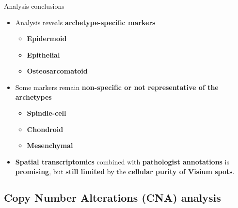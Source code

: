 \documentclass[aspectratio=169]{beamer}
\newcommand{\figpath}{/mnt/datadisk/Jordan/Delivrables/Rapports/Rapport_stage/Figures/Sans_légendes}
\begin{document}
\begin{frame}{Analysis conclusions}

    \begin{itemize}
        \item Analysis reveals \textbf{archetype-specific markers}
            \begin{itemize} 
                \item \textbf{Epidermoid}
                \item \textbf{Epithelial}
                \item \textbf{Osteosarcomatoid}
            \end{itemize}
        \item Some markers remain \textbf{non-specific or not representative of the archetypes}
            \begin{itemize} 
                \item \textbf{Spindle-cell}
                \item \textbf{Chondroid}
                \item \textbf{Mesenchymal}
            \end{itemize}
        \item \textbf{Spatial transcriptomics} combined with \textbf{pathologist annotations} is \textbf{promising}, but \textbf{still limited} by the \textbf{cellular purity of Visium spots}.
    \end{itemize}
    
\end{frame}






\subsection{Copy Number Alterations (CNA) analysis}



  

\begin{comment}
\begin{frame}
	\frametitle<presentation>{Chromosomic arms and cytobands}
	\begin{figure}
        \begin{minipage}{0.48\textwidth}
            \raggedleft

            \texttt{[image: \\figpath/cytobands\_chrom.png]}\\
        \end{minipage}


        \begin{minipage}{0.48\textwidth}            
            \raggedleft
            \tiny \color{gray} Source: Axel Feraut \href{https://cdn.unilim.fr/files/theses-exercice/P20113359.pdf}{cdn.unilim.fr}
		\end{minipage}

        \centering
        \textbf{Each chromosome arm (p and q) consists of a series of cytoband}
        \label{fig:chrom_cyto}
	\end{figure}
\end{frame}
\end{comment}
\end{document}
